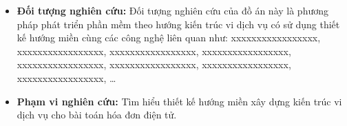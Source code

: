 \begin{itemize}

\item \textbf{Đối tượng nghiên cứu:} Đối tượng nghiên cứu của đồ án này là phương pháp phát triển phần mềm theo hướng kiến trúc vi dịch vụ có sử dụng thiết kế hướng miền cùng các công nghệ liên quan như: xxxxxxxxxxxxxxxxx, xxxxxxxxxxxxxxxxx, xxxxxxxxxxxxxxxxx, xxxxxxxxxxxxxxxxx, xxxxxxxxxxxxxxxxx, xxxxxxxxxxxxxxxxx, xxxxxxxxxxxxxxxxx, xxxxxxxxxxxxxxxxx, \dots

\item \textbf{Phạm vi nghiên cứu:} Tìm hiểu thiết kế hướng miền xây dựng kiến trúc vi dịch vụ cho bài toán hóa đơn điện tử.

\end{itemize}